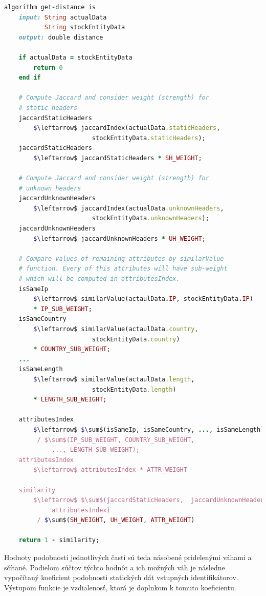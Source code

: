 \documentclass[
  digital, %
  table,   %
  lof,     %
  nolot,   %
  nocover
]{fithesis3}
\begin{document}
\vspace{6mm}
\begin{lstlisting}[basicstyle=\footnotesize, language=Ruby, mathescape=true]
algorithm get-distance is
    input: String actualData
           String stockEntityData
    output: double distance

    if actualData = stockEntityData
        return 0
    end if

    # Compute Jaccard and consider weight (strength) for 
    # static headers
    jaccardStaticHeaders 
    	$\leftarrow$ jaccardIndex(actualData.staticHeaders, 
    	                stockEntityData.staticHeaders);
    jaccardStaticHeaders 
    	$\leftarrow$ jaccardStaticHeaders * SH_WEIGHT;

    # Compute Jaccard and consider weight (strength) for 
    # unknown headers
    jaccardUnknownHeaders 
    	$\leftarrow$ jaccardIndex(actualData.unknownHeaders,
    	                stockEntityData.unknownHeaders);
    jaccardUnknownHeaders 
    	$\leftarrow$ jaccardUnknownHeaders * UH_WEIGHT;

    # Compare values of remaining attributes by similarValue
    # function. Every of this attributes will have sub-weight
    # which will be computed in attributesIndex.
    isSameIp 
    	$\leftarrow$ similarValue(actaulData.IP, stockEntityData.IP)
    	* IP_SUB_WEIGHT;
    isSameCountry 
    	$\leftarrow$ similarValue(actaulData.country, 
    	                stockEntityData.country)
    	* COUNTRY_SUB_WEIGHT;
    ...
    isSameLength 
    	$\leftarrow$ similarValue(actaulData.length, 
    	                stockEntityData.length)
    	* LENGTH_SUB_WEIGHT;

    attributesIndex 
    	$\leftarrow$ $\sum$(isSameIp, isSameCountry, ..., isSameLength) 
    	 / $\sum$(IP_SUB_WEIGHT, COUNTRY_SUB_WEIGHT,
    	     ..., LENGTH_SUB_WEIGHT);
    attributesIndex 
    	$\leftarrow$ attributesIndex * ATTR_WEIGHT

    similarity 
    	$\leftarrow$ $\sum$(jaccardStaticHeaders,  jaccardUnknownHeaders,
    	     attributesIndex) 
    	 / $\sum$(SH_WEIGHT, UH_WEIGHT, ATTR_WEIGHT)

    return 1 - similarity;
\end{lstlisting}

Hodnoty podobností jednotlivých častí sú teda násobené pridelenými váhami a
sčítané. Podielom súčtov týchto hodnôt a ich možných váh je následne vypočítaný
koeficient podobnosti statických dát vstupných identifikátorov. Výstupom 
funkcie je vzdialenosť, ktorá je doplnkom k tomuto koeficientu.
\end{document}
